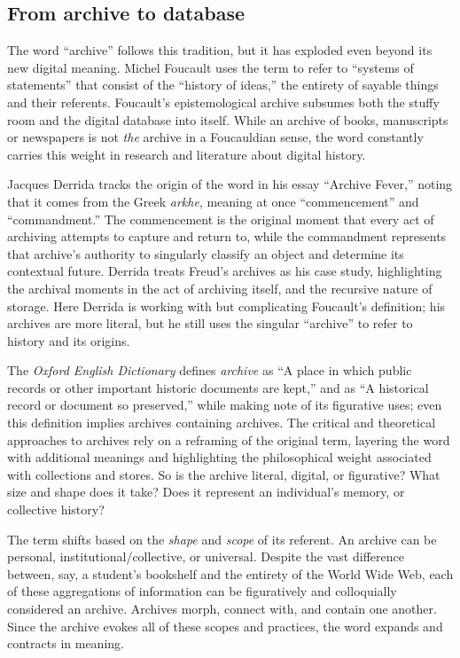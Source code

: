 \subsection{From archive to database}

The word ``archive'' follows this tradition, but it has exploded even beyond its new digital meaning. Michel Foucault uses the term to refer to ``systems of statements'' that consist of the ``history of ideas,'' the entirety of sayable things and their referents.\autocite[128-129, 137]{foucault_archaeology_1972} Foucault's epistemological archive subsumes both the stuffy room and the digital database into itself. While an archive of books, manuscripts or newspapers is not \emph{the} archive in a Foucauldian sense, the word constantly carries this weight in research and literature about digital history.

Jacques Derrida tracks the origin of the word in his essay ``Archive Fever,'' noting that it comes from the Greek \emph{arkhe}, meaning at once ``commencement'' and ``commandment.''\autocite[9]{derrida_archive_1995} The commencement is the original moment that every act of archiving attempts to capture and return to, while the commandment represents that archive's authority to singularly classify an object and determine its contextual future. Derrida treats Freud's archives as his case study, highlighting the archival moments in the act of archiving itself, and the recursive nature of storage. Here Derrida is working with but complicating Foucault's definition; his archives are more literal, but he still uses the singular ``archive'' to refer to history and its origins.

The \emph{Oxford English Dictionary} defines \emph{archive} as ``A place in which public records or other important historic documents are kept,'' and as ``A historical record or document so preserved,'' while making note of its figurative uses; even this definition implies archives containing archives. The critical and theoretical approaches to archives rely on a reframing of the original term, layering the word with additional meanings and highlighting the philosophical weight associated with collections and stores. So is the archive literal, digital, or figurative? What size and shape does it take? Does it represent an individual's memory, or collective history?

The term shifts based on the \emph{shape} and \emph{scope} of its referent. An archive can be personal, institutional/collective, or universal. Despite the vast difference between, say, a student's bookshelf and the entirety of the World Wide Web, each of these aggregations of information can be figuratively and colloquially considered an archive. Archives morph, connect with, and contain one another. Since the archive evokes all of these scopes and practices, the word expands and contracts in meaning.

